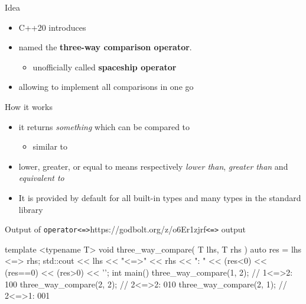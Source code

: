 \begin{frame}[fragile]
  \begin{block}{Idea}
    \begin{itemize}
    \item C++20 introduces 
    \item named the \textbf{three-way comparison operator}.
      \begin{itemize}
      \item unofficially called \textbf{spaceship operator}
      \end{itemize}
    \item allowing to implement all comparisons in one go
    \end{itemize}
  \end{block}
  \begin{exampleblock}{How it works}
    \begin{itemize}
    \item it returns \emph{something} which can be compared to 
      \begin{itemize}
      \item similar to 
      \end{itemize}
    \item lower, greater, or equal to  means respectively \emph{lower than}, \emph{greater than} and \emph{equivalent to}
    \item It is provided by default for all built-in types and many types in the standard library
    \end{itemize}
  \end{exampleblock}
\end{frame}

\begin{frame}[fragile]
  \begin{exampleblockGB}{Output of \texttt{operator<=>}}{https://godbolt.org/z/o6Er1zjrf}{\texttt{<=>} output}
    \begin{cppcode*}{}
    template <typename T>
    void three_way_compare( T lhs, T rhs ) {
      auto res = lhs <=> rhs;
      std::cout << lhs << "<=>" << rhs << ": "
                << (res<0) << (res==0) << (res>0)
                << '\n';
    }
    int main() {
      three_way_compare(1, 2); // 1<=>2: 100
      three_way_compare(2, 2); // 2<=>2: 010
      three_way_compare(2, 1); // 2<=>1: 001
    }
    \end{cppcode*}
  \end{exampleblockGB}
\end{frame}

